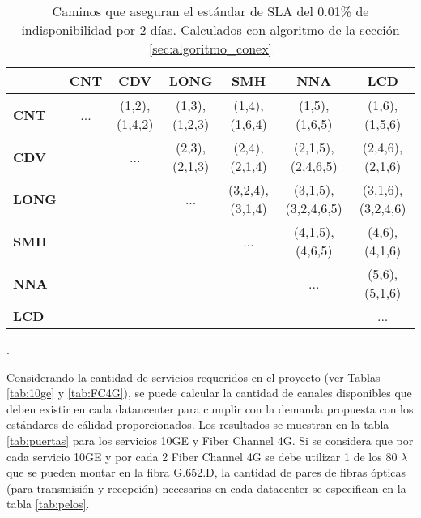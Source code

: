 \begin{table}[!hbt]
\centering
\begin{tabular}{||l | c | c | c | c | c | c||}
\hline
\hline
 & \textbf{CNT} & \textbf{CDV} & \textbf{LONG} & \textbf{SMH} & \textbf{NNA} & \textbf{LCD}  \\
\hline
\textbf{CNT} & ... & (1,2),(1,4,2) & (1,3),(1,2,3) & (1,4),(1,6,4) & (1,5),(1,6,5) & (1,6),(1,5,6)\\
\hline
\textbf{CDV} &  & ... & (2,3),(2,1,3) & (2,4),(2,1,4) & (2,1,5),(2,4,6,5) & (2,4,6),(2,1,6)\\
\hline
\textbf{LONG} &  &  & ... & (3,2,4),(3,1,4) & (3,1,5),(3,2,4,6,5) & (3,1,6),(3,2,4,6)\\
\hline
\textbf{SMH} &  &  &  & ... & (4,1,5),(4,6,5) & (4,6),(4,1,6)\\
\hline
\textbf{NNA} & & & & & ... & (5,6),(5,1,6)\\
\hline
\textbf{LCD} & & & & & & ... \\
\hline
\end{tabular}
\caption[Caminos calculados por algoritmo de disponibilidad]{Caminos que aseguran el estándar de SLA del 0.01\% de indisponibilidad por 2 días. Calculados con algoritmo de la sección \ref{sec:algoritmo_conex}}.
\label{tab:caminos}
\end{table}

Considerando la cantidad de servicios requeridos en el proyecto (ver Tablas \ref{tab:10ge} y \ref{tab:FC4G}), se puede calcular la cantidad de canales disponibles que deben existir en cada datancenter para cumplir con la demanda propuesta con los estándares de cálidad proporcionados. Los resultados se muestran en la tabla \ref{tab:puertas} para los servicios 10GE y Fiber Channel 4G. Si se considera que por cada servicio 10GE y por cada 2 Fiber Channel 4G se debe utilizar 1 de los 80 $\lambda$ que se pueden montar en la fibra G.652.D, la cantidad de pares de fibras ópticas (para transmisión y recepción) necesarias en cada datacenter se especifican en la tabla \ref{tab:pelos}.

